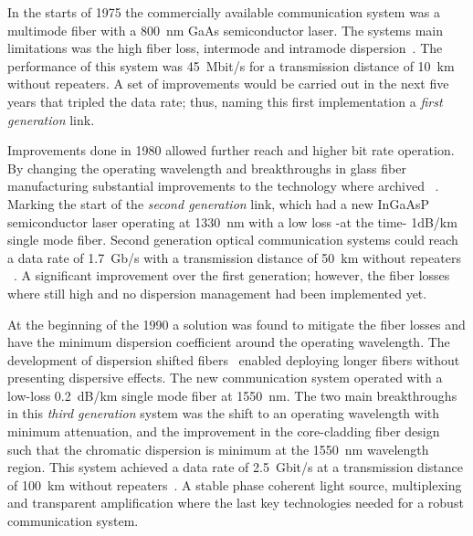 In the starts of 1975 the commercially available communication system was a multimode fiber with a 800~nm GaAs semiconductor laser. The systems main limitations was the high fiber loss, intermode and intramode dispersion~\cite{OFCNetwork}. The performance of this system was 45~Mbit/s for a transmission distance of 10~km without repeaters. A set of improvements  would be carried out in the next five years that tripled the data rate; thus, naming this first implementation a\emph{ first generation} link.~\cite{COChistory} 
 
 
Improvements done in 1980 allowed further reach and higher bit rate operation. By changing the operating wavelength and breakthroughs in glass fiber manufacturing substantial improvements to the technology where archived ~\cite{COChistory,Sharma2013ARO}. Marking the start of the \emph{second generation} link, which had a new  InGaAsP semiconductor laser operating at 1330~nm with a low loss -at the time- 1dB/km single mode fiber. Second generation optical communication systems could reach a data rate of 1.7~Gb/s with a transmission distance of 50~km without repeaters ~\cite{ModForm,Sharma2013ARO}. A significant improvement over the first generation; however, the fiber losses where still high and no dispersion management had been implemented yet. 

At the beginning of the 1990 a solution was found to mitigate the fiber losses and have the minimum dispersion coefficient around the operating wavelength. The development of dispersion shifted fibers~\cite{COChistory} enabled deploying longer fibers without presenting dispersive effects.  The new communication system operated with a low-loss 0.2~dB/km single mode fiber at 1550~nm. The two main breakthroughs in this \emph{third generation} system was the shift to an operating wavelength with minimum attenuation, and the improvement in the core-cladding fiber design such that the chromatic dispersion is minimum at the 1550~nm wavelength region. This system achieved a data rate of 2.5~Gbit/s at a
transmission distance of 100~km without repeaters~\cite{ModForm,Sharma2013ARO}. A stable phase coherent light source, multiplexing and transparent amplification  where the last key technologies needed for a robust communication system.

